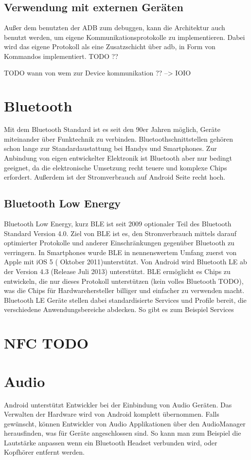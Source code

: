 \documentclass[12pt,journal,compsoc]{IEEEtran}
\begin{document}
\subsection{Verwendung mit externen Geräten}
Außer dem benutzten der ADB zum debuggen, kann die Architektur auch benutzt werden, um eigene Kommunikationsprotokolle zu implementieren.
Dabei wird das eigene Protokoll als eine Zusatzschicht über adb, in Form von Kommandos implementiert. TODO ??


TODO wann von wem zur Device kommunikation ?? --> IOIO

\section{Bluetooth}
Mit dem Bluetooth Standard ist es seit den 90er Jahren möglich, Geräte miteinander über Funktechnik zu verbinden. Bluetoothschnittstellen gehören schon lange zur Standardaustattung bei Handys und Smartphones.
Zur Anbindung von eigen entwickelter Elektronik ist Bluetooth aber nur bedingt geeignet, da die elektronische Umsetzung recht teuere und komplexe Chips erfordert. Außerdem ist der Stromverbrauch auf Android Seite recht hoch.
\subsection{Bluetooth Low Energy}
Bluetooth Low Energy, kurz BLE ist seit 2009 optionaler Teil des Bluetooth Standard Version 4.0. 
Ziel von BLE ist es, den Stromverbrauch mittels darauf optimierter Protokolle und anderer Einschränkungen gegenüber Bluetooth zu verringern.
In Smartphones wurde BLE in nennenswertem Umfang zuerst von Apple mit iOS 5 ( Oktober 2011)unterstützt.
Von Android wird Bluetooth LE ab der Version 4.3 (Release Juli 2013) unterstützt.
BLE ermöglicht es Chips zu entwickeln, die nur dieses Protokoll unterstützen (kein volles Bluetooth TODO), was die Chips für Hardwarehersteller billiger und einfacher zu verwenden macht.
Bluetooth LE Geräte stellen dabei standardisierte Services und Profile bereit, die verschiedene Anwendungsbereiche abdecken.
So gibt es zum Beispiel Services  
\cite{bluetooth}

\section{NFC TODO}


\section{Audio}
Android unterstützt Entwickler bei der Einbindung von Audio Geräten. Das Verwalten der Hardware wird von Android komplett übernommen.
Falls gewünscht, können Entwickler von Audio Applikationen über den AudioManager herausfinden, was für Geräte angeschlossen sind. So kann man zum Beispiel die Lautstärke anpassen wenn ein Bluetooth Headset verbunden wird, oder Kopfhörer entfernt werden.
\end{document}
